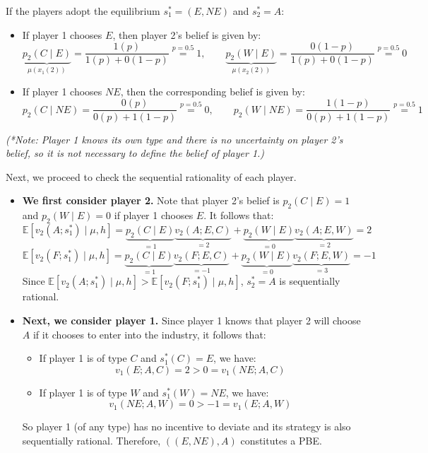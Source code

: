 \documentclass[twoside]{article}
\theoremstyle{definitionstyle}
\begin{document}
If the players adopt the equilibrium $s_1^* = (E, NE)$ and $s_2^* = A$:
\begin{itemize}
    \item If player 1 chooses $E$, then player 2's belief is given by:
    $$\underbrace{p_2(C \mid E)}_{\mu(x_1(2))} = \frac{1(p)}{1(p) + 0(1 - p)} \overset{p=0.5}{=} 1, \qquad \underbrace{p_2(W \mid E)}_{\mu(x_2(2))} = \frac{0(1 - p)}{1(p) + 0(1 - p)} \overset{p=0.5}{=} 0$$
    
    \item If player 1 chooses $NE$, then the corresponding belief is given by:
    $$p_2(C \mid NE) = \frac{0(p)}{0(p) + 1(1 - p)} \overset{p=0.5}{=} 0, \qquad p_2(W \mid NE) = \frac{1(1 - p)}{0(p) + 1(1 - p)} \overset{p=0.5}{=} 1$$
\end{itemize}
\textit{(*Note: Player 1 knows its own type and there is no uncertainty on player 2's belief, so it is not necessary to define the belief of player 1.)}

Next, we proceed to check the sequential rationality of each player.
\begin{itemize}
    \item \textbf{We first consider player 2.} Note that player 2's belief is $p_2(C \mid E) = 1$ and $p_2(W \mid E) = 0$ if player 1 chooses $E$. It follows that:
    $$\mathbb{E}[v_2(A; s_1^*) \mid \mu, h] = \underbrace{p_2(C \mid E)}_{=1} \underbrace{v_2(A; E, C)}_{=2} + \underbrace{p_2(W \mid E)}_{=0} \underbrace{v_2(A; E, W)}_{=2} = 2$$
    $$\mathbb{E}[v_2(F; s_1^*) \mid \mu, h] = \underbrace{p_2(C \mid E)}_{=1} \underbrace{v_2(F; E, C)}_{=-1} + \underbrace{p_2(W \mid E)}_{=0} \underbrace{v_2(F; E, W)}_{=3} = -1$$
    Since $\mathbb{E}[v_2(A; s_1^*) \mid \mu, h] > \mathbb{E}[v_2(F; s_1^*) \mid \mu, h]$, $s_2^* = A$ is sequentially rational.

    \item \textbf{Next, we consider player 1.} Since player 1 knows that player 2 will choose $A$ if it chooses to enter into the industry, it follows that:
    \begin{itemize}
        \item If player 1 is of type $C$ and $s_1^*(C) = E$, we have:
        $$v_1(E; A, C) = 2 > 0 = v_1(NE; A, C)$$
        \item If player 1 is of type $W$ and $s_1^*(W) = NE$, we have:
        $$v_1(NE; A, W) = 0 > -1 = v_1(E; A, W)$$
    \end{itemize}
    So player 1 (of any type) has no incentive to deviate and its strategy is also sequentially rational. Therefore, $((E, NE), A)$ constitutes a PBE.
\end{itemize}
\end{document}
